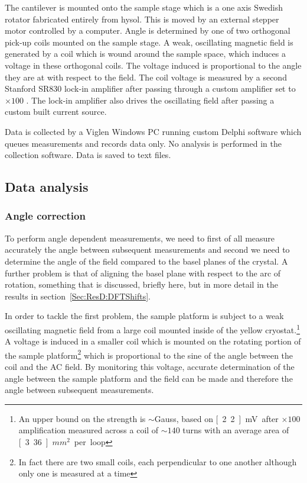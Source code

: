 The cantilever is mounted onto the sample stage which is a one axis Swedish rotator fabricated entirely from hysol. This is moved by an external stepper motor controlled by a computer. Angle is determined by one of two orthogonal pick-up coils mounted on the sample stage. A weak, oscillating magnetic field is generated by a coil which is wound around the sample space, which induces a voltage in these orthogonal coils. The voltage induced is proportional to the angle they are at with respect to the field. The coil voltage is measured by a second Stanford SR830 lock-in amplifier after passing through a custom amplifier set to $\times100$ . The lock-in amplifier also drives the oscillating field after passing a custom built current source.

Data is collected by a Viglen Windows PC running custom Delphi software which queues measurements and records data only. No analysis is performed in the collection software. Data is saved to text files.

\subsection{Data analysis}

\subsubsection{Angle correction}
    \label{Sec:Exp:AngleCorrection}

To perform angle dependent measurements, we need to first of all measure accurately the angle between subsequent measurements and second we need to determine the angle of the field compared to the basel planes of the crystal. A further problem is that of aligning the basel plane with respect to the arc of rotation, something that is discussed, briefly here, but in more detail in the results in section~\ref{Sec:ResD:DFTShifts}.

In order to tackle the first problem, the sample platform is subject to a weak oscillating magnetic field from a large coil mounted inside of the yellow cryostat.\footnote{An upper bound on the strength is $\sim$\unit[500]{Gauss}, based on \unit[2.2]{mV} after $\times100$ amplification measured across a coil of $\sim140$ turns with an average area of \unit[3.36]{$mm^2$} per loop} A voltage is induced in a smaller coil which is mounted on the rotating portion of the sample platform\footnote{In fact there are two small coils, each perpendicular to one another although only one is measured at a time} which is proportional to the sine of the angle between the coil and the AC field. By monitoring this voltage, accurate determination of the angle between the sample platform and the field can be made and therefore the angle between subsequent measurements.

